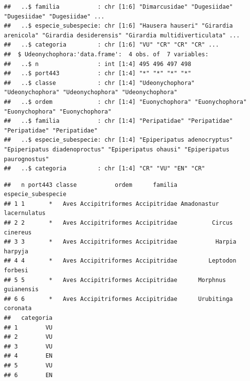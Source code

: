\documentclass[
]{article}
\newenvironment{Shaded}{\begin{snugshade}}{\end{snugshade}}
\newcommand{\CommentTok}[1]{\textcolor[rgb]{0.56,0.35,0.01}{\textit{#1}}}
\newcommand{\FunctionTok}[1]{\textcolor[rgb]{0.00,0.00,0.00}{#1}}
\newcommand{\NormalTok}[1]{#1}
\newcommand{\SpecialCharTok}[1]{\textcolor[rgb]{0.00,0.00,0.00}{#1}}
\begin{document}
\begin{verbatim}
##   ..$ familia           : chr [1:6] "Dimarcusidae" "Dugesiidae" "Dugesiidae" "Dugesiidae" ...
##   ..$ especie_subespecie: chr [1:6] "Hausera hauseri" "Girardia arenicola" "Girardia desiderensis" "Girardia multidiverticulata" ...
##   ..$ categoria         : chr [1:6] "VU" "CR" "CR" "CR" ...
##  $ Udeonychophora:'data.frame':  4 obs. of  7 variables:
##   ..$ n                 : int [1:4] 495 496 497 498
##   ..$ port443           : chr [1:4] "*" "*" "*" "*"
##   ..$ classe            : chr [1:4] "Udeonychophora" "Udeonychophora" "Udeonychophora" "Udeonychophora"
##   ..$ ordem             : chr [1:4] "Euonychophora" "Euonychophora" "Euonychophora" "Euonychophora"
##   ..$ familia           : chr [1:4] "Peripatidae" "Peripatidae" "Peripatidae" "Peripatidae"
##   ..$ especie_subespecie: chr [1:4] "Epiperipatus adenocryptus" "Epiperipatus diadenoproctus" "Epiperipatus ohausi" "Epiperipatus paurognostus"
##   ..$ categoria         : chr [1:4] "CR" "VU" "EN" "CR"
\end{verbatim}

\begin{Shaded}
\end{Shaded}

\begin{verbatim}
##   n port443 classe           ordem      familia       especie_subespecie
## 1 1       *   Aves Accipitriformes Accipitridae Amadonastur lacernulatus
## 2 2       *   Aves Accipitriformes Accipitridae          Circus cinereus
## 3 3       *   Aves Accipitriformes Accipitridae           Harpia harpyja
## 4 4       *   Aves Accipitriformes Accipitridae         Leptodon forbesi
## 5 5       *   Aves Accipitriformes Accipitridae      Morphnus guianensis
## 6 6       *   Aves Accipitriformes Accipitridae      Urubitinga coronata
##   categoria
## 1        VU
## 2        VU
## 3        VU
## 4        EN
## 5        VU
## 6        EN
\end{verbatim}

\begin{Shaded}
\end{Shaded}
\end{document}
